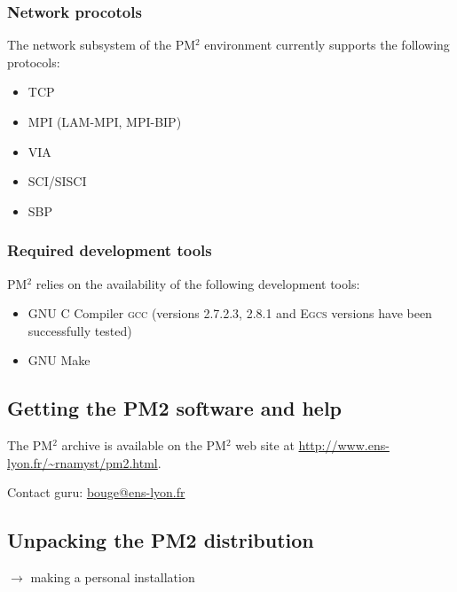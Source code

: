 \documentclass[a4paper,11pt]{article}
\def\pm2{PM$^2$\xspace}
\begin{document}
\subsubsection{Network procotols}
The network subsystem of the \pm2 environment currently supports
the following protocols:
\begin{itemize}
\footnotesize
\item TCP
\item MPI (LAM-MPI, MPI-BIP)
\item VIA
\item SCI/SISCI
\item SBP
\end{itemize}

\subsubsection{Required development tools}
\pm2 relies on the availability of the following development tools:
\begin{itemize}
\footnotesize
\item GNU C Compiler \textsc{gcc} (versions 2.7.2.3, 2.8.1 and \textsc{Egcs}
versions have been successfully tested)
\item GNU Make
\end{itemize}
 
\subsection{Getting the PM2 software and help}
The \pm2 archive is available on the \pm2 web site at 
\url{http://www.ens-lyon.fr/~rnamyst/pm2.html}.

Contact guru: \url{bouge@ens-lyon.fr}

\subsection{Unpacking the PM2 distribution}
        $\rightarrow$ making a personal installation
\end{document}
